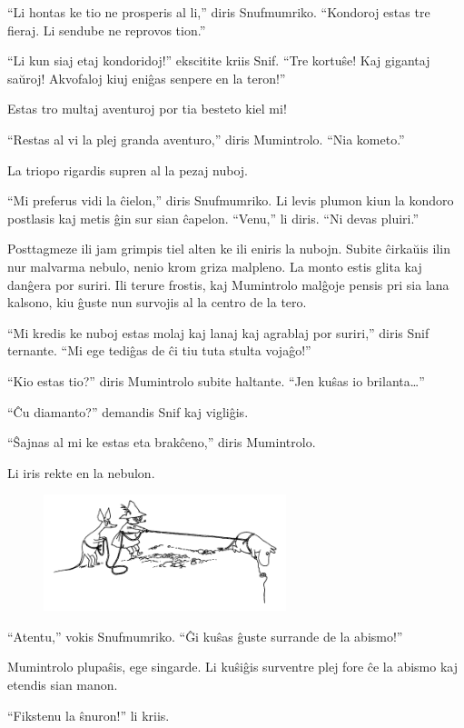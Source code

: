 ``Li hontas ke tio ne prosperis al li,'' diris Snufmumriko. ``Kondoroj estas tre fieraj. Li sendube ne reprovos tion.''

``Li kun siaj etaj kondoridoj!'' ekscitite kriis Snif. ``Tre kortuŝe! Kaj gigantaj saŭroj! Akvofaloj kiuj eniĝas senpere en la teron!''

Estas tro multaj aventuroj por tia besteto kiel mi!

``Restas al vi la plej granda aventuro,'' diris Mumintrolo. ``Nia kometo.''

La triopo rigardis supren al la pezaj nuboj.

``Mi preferus vidi la ĉielon,'' diris Snufmumriko. Li levis plumon kiun la kondoro postlasis kaj metis ĝin sur sian ĉapelon. ``Venu,'' li diris. ``Ni devas pluiri.''

Posttagmeze ili jam grimpis tiel alten ke ili eniris la nubojn. Subite ĉirkaŭis ilin nur malvarma nebulo, nenio krom griza malpleno. La monto estis glita kaj danĝera por suriri. Ili terure frostis, kaj Mumintrolo malĝoje pensis pri sia lana kalsono, kiu ĝuste nun survojis al la centro de la tero.

``Mi kredis ke nuboj estas molaj kaj lanaj kaj agrablaj por suriri,'' diris Snif ternante. ``Mi ege tediĝas de ĉi tiu tuta stulta vojaĝo!''

``Kio estas tio?'' diris Mumintrolo subite haltante. ``Jen kuŝas io brilanta{\ldots}''

``Ĉu diamanto?'' demandis Snif kaj vigliĝis.

``Ŝajnas al mi ke estas eta brakĉeno,'' diris Mumintrolo.

Li iris rekte en la nebulon.

\begin{figure}
\includegraphics[width=200pt,height=96pt]{4-3.png}\end{figure}

``Atentu,'' vokis Snufmumriko. ``Ĝi kuŝas ĝuste surrande de la abismo!''

Mumintrolo plupaŝis, ege singarde. Li kuŝiĝis surventre plej fore ĉe la abismo kaj etendis sian manon.

``Fikstenu la ŝnuron!'' li kriis.

